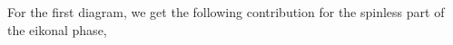 For the first diagram, we get the following contribution for the spinless part of the eikonal phase,

